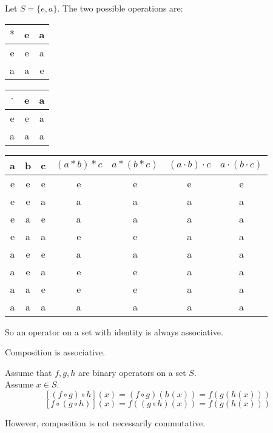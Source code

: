 \documentclass[letterpaper,12pt,fleqn]{article}
\begin{document}
\begin{example}
  Let $S=\{e,a\}$.  The two possible operations are:

\begin{tabular}{c|cc}
  $*$ & e & a \\
  \hline
  e & e & a \\
  a & a & e \\
\end{tabular}\hspace{0.25in}
\begin{tabular}{c|cc}
  $\cdot$ & e & a \\
  \hline
  e & e & a \\
  a & a & a \\
\end{tabular}

\begin{tabular}{ccc|cc|cc}
  a & b & c & $(a*b)*c$ & $a*(b*c)$ &
      $(a\cdot b)\cdot c$ & $a\cdot(b\cdot c)$ \\
  \hline
  e & e & e & e & e & e & e \\
  e & e & a & a & a & a & a \\
  e & a & e & a & a & a & a \\
  e & a & a & e & e & a & a \\
  a & e & e & a & a & a & a \\
  a & e & a & e & e & a & a \\
  a & a & e & e & e & a & a \\
  a & a & a & a & a & a & a \\
\end{tabular}
\end{example}

So an operator on a set with identity is always associative.

\begin{theorem}
  Composition is associative.
\end{theorem}

\begin{theproof}
  Assume that $f,g,h$ are binary operators on a set $S$. \\
  Assume $x\in S$.
  \[[(f\circ g)\circ h](x)=(f\circ g)(h(x))=f(g(h(x)))\]
  \[[f\circ(g\circ h)](x)=f((g\circ h)(x))=f(g(h(x)))\]
\end{theproof}

However, composition is not necessarily commutative.
\end{document}
